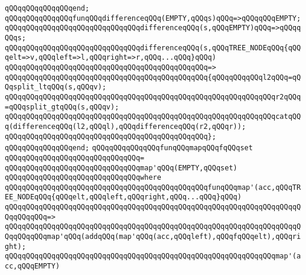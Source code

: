 \verb|qQQqqQQqqQQqqQQqend;|\newline
\newline
\newline
\verb|qQQqqQQqqQQqqQQqfunqQQqdifferenceqQQq(EMPTY,qQQqs)qQQq=>qQQqqQQqEMPTY;|\newline
\verb|qQQqqQQqqQQqqQQqqQQqqQQqqQQqqQQqdifferenceqQQq(s,qQQqEMPTY)qQQq=>qQQqqQQqs;|\newline
\newline
\verb|qQQqqQQqqQQqqQQqqQQqqQQqqQQqqQQqdifferenceqQQq(s,qQQqTREE_NODEqQQq{qQQqelt=>v,qQQqleft=>l,qQQqright=>r,qQQq...qQQq}qQQq)|\newline
\verb|qQQqqQQqqQQqqQQqqQQqqQQqqQQqqQQqqQQqqQQqqQQqqQQq=>|\newline
\verb|qQQqqQQqqQQqqQQqqQQqqQQqqQQqqQQqqQQqqQQqqQQqqQQq{qQQqqQQqqQQql2qQQq=qQQqsplit_ltqQQq(s,qQQqv);|\newline
\verb|qQQqqQQqqQQqqQQqqQQqqQQqqQQqqQQqqQQqqQQqqQQqqQQqqQQqqQQqqQQqqQQqr2qQQq=qQQqsplit_gtqQQq(s,qQQqv);|\newline
\newline
\verb|qQQqqQQqqQQqqQQqqQQqqQQqqQQqqQQqqQQqqQQqqQQqqQQqqQQqqQQqqQQqqQQqcatqQQq(differenceqQQq(l2,qQQql),qQQqdifferenceqQQq(r2,qQQqr));|\newline
\verb|qQQqqQQqqQQqqQQqqQQqqQQqqQQqqQQqqQQqqQQqqQQqqQQq};|\newline
\verb|qQQqqQQqqQQqqQQqend;|\newline
\newline
\newline
\verb|qQQqqQQqqQQqqQQqfunqQQqmapqQQqfqQQqset|\newline
\verb|qQQqqQQqqQQqqQQqqQQqqQQqqQQqqQQq=|\newline
\verb|qQQqqQQqqQQqqQQqqQQqqQQqqQQqqQQqmap'qQQq(EMPTY,qQQqset)|\newline
\verb|qQQqqQQqqQQqqQQqqQQqqQQqqQQqqQQqwhere|\newline
\verb|qQQqqQQqqQQqqQQqqQQqqQQqqQQqqQQqqQQqqQQqqQQqqQQqfunqQQqmap'(acc,qQQqTREE_NODEqQQq{qQQqelt,qQQqleft,qQQqright,qQQq...qQQq}qQQq)|\newline
\verb|qQQqqQQqqQQqqQQqqQQqqQQqqQQqqQQqqQQqqQQqqQQqqQQqqQQqqQQqqQQqqQQqqQQqqQQqqQQqqQQq=>|\newline
\verb|qQQqqQQqqQQqqQQqqQQqqQQqqQQqqQQqqQQqqQQqqQQqqQQqqQQqqQQqqQQqqQQqqQQqqQQqqQQqqQQqmap'qQQq(addqQQq(map'qQQq(acc,qQQqleft),qQQqfqQQqelt),qQQqright);|\newline
\newline
\verb|qQQqqQQqqQQqqQQqqQQqqQQqqQQqqQQqqQQqqQQqqQQqqQQqqQQqqQQqqQQqqQQqmap'(acc,qQQqEMPTY)|\newline
